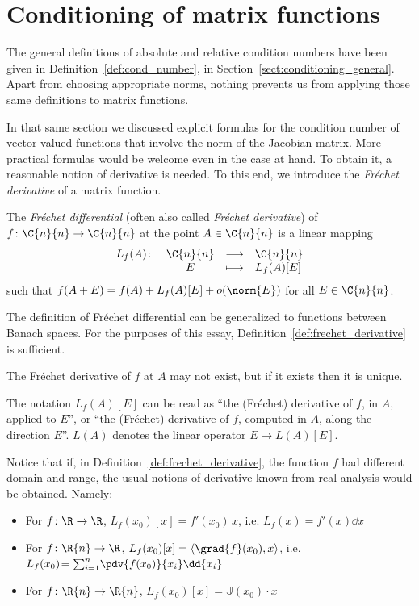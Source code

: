 \section{Conditioning of matrix functions}\label{sect:cond_matfun}
The general definitions of absolute and relative condition numbers have been given in Definition~\ref{def:cond_number}, in Section~\ref{sect:conditioning_general}. Apart from choosing appropriate norms, nothing prevents us from applying those same definitions to matrix functions. 

In that same section we discussed explicit formulas for the condition number of vector-valued functions that involve the norm of the Jacobian matrix. More practical formulas would be welcome even in the case at hand.
To obtain it, a reasonable notion of derivative is needed. To this end, we introduce the \emph{Fréchet derivative} of a matrix function.

\begin{definizione}\label{def:frechet_derivative}
	The \emph{Fréchet differential} (often also called \emph{Fréchet derivative}) of  $f\colon\C{n}{n}\to\C{n}{n}$ at the point $A\in\C{n}{n}$ is a linear mapping 
	\[
		\begin{array}{rccl}
			L_f(A)\colon & \C{n}{n} & \longrightarrow & \C{n}{n}\\
					& E & \longmapsto & L_f(A)[E]
		\end{array}
	\]
	such that $f(A+E) = f(A) + L_f(A)[E] + o(\norm{E})$ for all $E\in\C{n}{n}$.
\end{definizione}
The definition of Fréchet differential can be generalized to functions between Banach spaces. For the purposes of this essay, Definition~\ref{def:frechet_derivative} is sufficient.

The Fréchet derivative of $f$ at $A$ may not exist, but if it exists then it is unique.  

\begin{notazione*}
	The notation $L_{f}(A)[E]$ can be read as ``the (Fréchet) derivative of $f$, in $A$, applied to $E$'', or ``the (Fréchet) derivative of $f$, computed in $A$, along the direction $E$''. 
	$L(A)$ denotes the linear operator $E\mapsto L(A)[E]$.
	
\end{notazione*}

\begin{oss}\label{oss:frechet_generalizza}
	Notice that if, in Definition~\ref{def:frechet_derivative}, the function $f$ had different domain and range, the usual notions of derivative known from real analysis would be obtained. Namely:
	\begin{itemize}
		\item For $f\colon\R\to\R$, $L_f(x_0)[x]=f'(x_0)\,x$, i.e. $L_f(x)=f'(x)\dd{x}$
		\item For $f\colon\R{n}\to\R$, $L_f(x_0)[x]=\left\langle\grad{f}(x_0),x\right\rangle$, i.e. $L_f(x_0)\!=\sum_{i=1}^n\!\pdv{f(x_0)}{x_i}\dd{x_i}$
		\item For $f\colon\R{n}\to\R{n}$, $L_f(x_0)[x]=\mathbb{J}(x_0)\cdot x$
	\end{itemize}
\end{oss}

